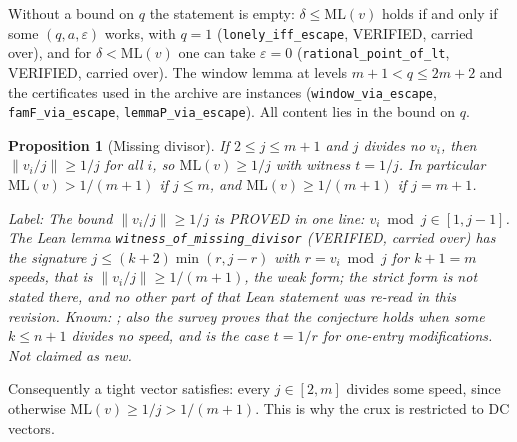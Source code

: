 \documentclass[11pt]{article}
\newtheorem{proposition}[theorem]{Proposition}
\theoremstyle{remark}
\newcommand{\norm}[1]{\lVert #1\rVert}
\newcommand{\ML}{\mathrm{ML}}
\newcommand{\lab}[1]{\par\smallskip\noindent\textit{Label: #1.}}
\begin{document}
Without a bound on $q$ the statement is empty: $\delta\le\ML(v)$ holds if and only if some $(q,a,\varepsilon)$ works, with $q=1$ (\texttt{lonely\_iff\_escape}, VERIFIED, carried over), and for $\delta<\ML(v)$ one can take $\varepsilon=0$ (\texttt{rational\_point\_of\_lt}, VERIFIED, carried over). The window lemma at levels $m+1<q\le2m+2$ and the certificates used in the archive are instances (\texttt{window\_via\_escape}, \texttt{famF\_via\_escape}, \texttt{lemmaP\_via\_escape}). All content lies in the bound on $q$.

\begin{proposition}[Missing divisor]\label{prop:dc}
If $2\le j\le m+1$ and $j$ divides no $v_i$, then $\norm{v_i/j}\ge1/j$ for all $i$, so $\ML(v)\ge1/j$ with witness $t=1/j$. In particular $\ML(v)>1/(m+1)$ if $j\le m$, and $\ML(v)\ge1/(m+1)$ if $j=m+1$.
\end{proposition}
\lab{The bound $\norm{v_i/j}\ge1/j$ is PROVED in one line: $v_i\bmod j\in[1,j-1]$. The Lean lemma \texttt{witness\_of\_missing\_divisor} (VERIFIED, carried over) has the signature $j\le(k+2)\min(r,j-r)$ with $r=v_i\bmod j$ for $k+1=m$ speeds, that is $\norm{v_i/j}\ge1/(m+1)$, the weak form; the strict form is not stated there, and no other part of that Lean statement was re-read in this revision. Known: \cite[Lemma~5.1(i)]{Tao18}; also the survey \cite{PS25} proves that the conjecture holds when some $k\le n+1$ divides no speed, and \cite[Lemma~2.3]{Zhang26} is the case $t=1/r$ for one-entry modifications. Not claimed as new}

Consequently a tight vector satisfies: every $j\in[2,m]$ divides some speed, since otherwise $\ML(v)\ge1/j>1/(m+1)$. This is why the crux is restricted to DC vectors.
\end{document}
